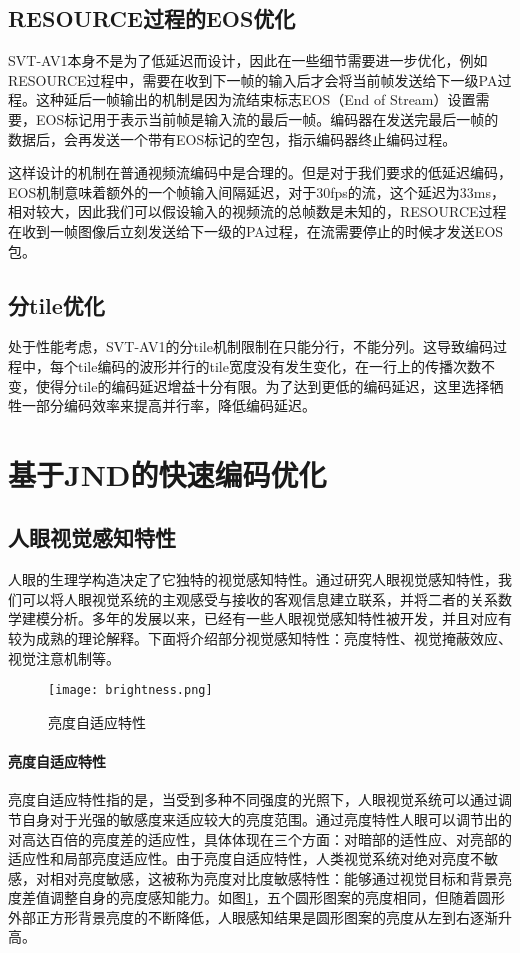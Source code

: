 \subsection{RESOURCE过程的EOS优化}
  SVT-AV1本身不是为了低延迟而设计，因此在一些细节需要进一步优化，例如RESOURCE过程中，需要在收到下一帧的输入后才会将当前帧发送给下一级PA过程。这种延后一帧输出的机制是因为流结束标志EOS（End of Stream）设置需要，EOS标记用于表示当前帧是输入流的最后一帧。编码器在发送完最后一帧的数据后，会再发送一个带有EOS标记的空包，指示编码器终止编码过程。

  这样设计的机制在普通视频流编码中是合理的。但是对于我们要求的低延迟编码，EOS机制意味着额外的一个帧输入间隔延迟，对于30fps的流，这个延迟为33ms，相对较大，因此我们可以假设输入的视频流的总帧数是未知的，RESOURCE过程在收到一帧图像后立刻发送给下一级的PA过程，在流需要停止的时候才发送EOS包。
\subsection{分tile优化}
  处于性能考虑，SVT-AV1的分tile机制限制在只能分行，不能分列。这导致编码过程中，每个tile编码的波形并行的tile宽度没有发生变化，在一行上的传播次数不变，使得分tile的编码延迟增益十分有限。为了达到更低的编码延迟，这里选择牺牲一部分编码效率来提高并行率，降低编码延迟。


\section{基于JND的快速编码优化}

  \subsection{人眼视觉感知特性} \label{sec:HVS}
  人眼的生理学构造决定了它独特的视觉感知特性。通过研究人眼视觉感知特性，我们可以将人眼视觉系统的主观感受与接收的客观信息建立联系，并将二者的关系数学建模分析。多年的发展以来，已经有一些人眼视觉感知特性被开发，并且对应有较为成熟的理论解释。下面将介绍部分视觉感知特性：亮度特性、视觉掩蔽效应、视觉注意机制等。

  \begin{figure}[!htp]
    \centering
    \texttt{[image: brightness.png]}
    \caption{亮度自适应特性}
  \label{fig:brightness}
  \end{figure}

  \paragraph{亮度自适应特性} 亮度自适应特性指的是，当受到多种不同强度的光照下，人眼视觉系统可以通过调节自身对于光强的敏感度来适应较大的亮度范围。通过亮度特性人眼可以调节出的对高达百倍的亮度差的适应性，具体体现在三个方面：对暗部的适性应、对亮部的适应性和局部亮度适应性。由于亮度自适应特性，人类视觉系统对绝对亮度不敏感，对相对亮度敏感，这被称为亮度对比度敏感特性：能够通过视觉目标和背景亮度差值调整自身的亮度感知能力。如图\ref{fig:brightness}，五个圆形图案的亮度相同，但随着圆形外部正方形背景亮度的不断降低，人眼感知结果是圆形图案的亮度从左到右逐渐升高。


